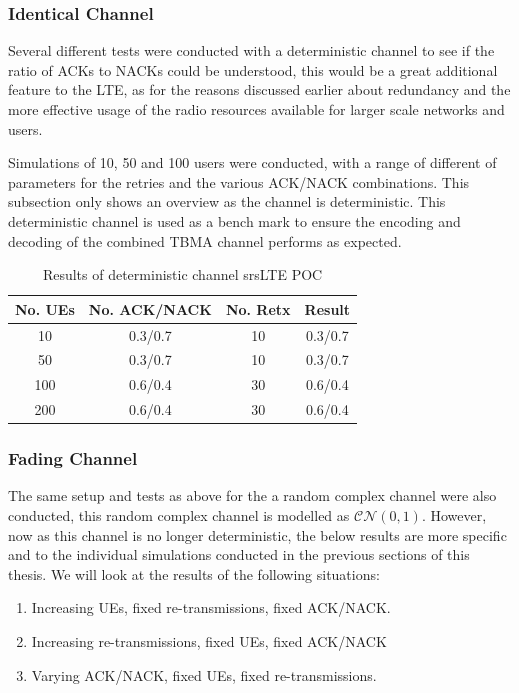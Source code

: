 \documentclass{article}
\begin{document}
\subsubsection{Identical Channel}
Several different tests were conducted with a deterministic channel to see if the ratio of ACKs to NACKs could be understood, this would be a great additional feature to the LTE, as for the reasons discussed earlier about redundancy and the more effective usage of the radio resources available for larger scale networks and users. 

Simulations of 10, 50 and 100 users were conducted, with a range of different of parameters for the retries and the various ACK/NACK combinations. This subsection only shows an overview as the channel is deterministic. This deterministic channel is used as a bench mark to ensure the encoding and decoding of the combined TBMA channel performs as expected. 

\begin{table}[H]
    \centering
 \begin{tabular}{||c c c c||} 
 \hline
 No. UEs & No. ACK/NACK & No. Retx & Result \\ [0.5ex] 
 \hline\hline
 10 & 0.3/0.7 & 10 &  0.3/0.7 \\ 
 \hline
 50 & 0.3/0.7 & 10 & 0.3/0.7 \\
 \hline
 100 & 0.6/0.4 & 30 & 0.6/0.4 \\
 \hline
 200 & 0.6/0.4 & 30 & 0.6/0.4 \\ [1ex] 
 \hline
\end{tabular}
    \caption{Results of deterministic channel srsLTE POC}
    \label{tab:my_label}
\end{table}

\subsubsection{Fading Channel}
The same setup and tests as above for the a random complex channel were also conducted, this random complex channel is modelled as $\mathcal{CN}(0,1)$. However, now as this channel is no longer deterministic, the below results are more specific and to the individual simulations conducted in the previous sections of this thesis. We will look at the results of the following situations:

\begin{enumerate}
    \item Increasing UEs, fixed re-transmissions, fixed ACK/NACK. 
    \item Increasing re-transmissions, fixed UEs, fixed ACK/NACK
    \item Varying ACK/NACK, fixed UEs, fixed re-transmissions.
\end{enumerate}
\end{document}
